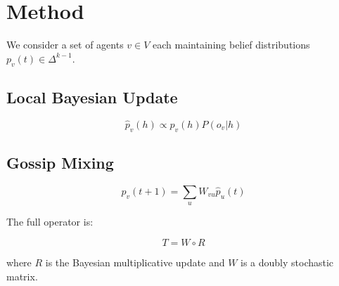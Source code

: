 \section{Method}

We consider a set of agents $v \in V$ each maintaining belief distributions $p_v(t) \in \Delta^{k-1}$.

\subsection{Local Bayesian Update}

\[
\hat{p}_v(h) \propto p_v(h) P(o_v | h)
\]

\subsection{Gossip Mixing}

\[
p_v(t+1) = \sum_u W_{vu} \hat{p}_u(t)
\]

The full operator is:

\[
T = W \circ R
\]

where $R$ is the Bayesian multiplicative update and $W$ is a doubly stochastic matrix.
